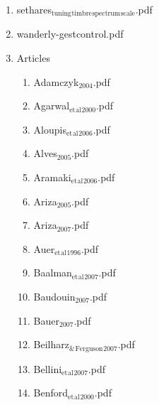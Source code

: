 \documentclass[11pt]{article}
\begin{document}
\begin{enumerate}
\item sethares$_{\text{tuning}}$$_{\text{timbre}}$$_{\text{spectrum}}$$_{\text{scale}}$.pdf
\label{sec-1-1-1-1-11-19-15}

\item wanderly-gestcontrol.pdf
\label{sec-1-1-1-1-11-19-16}

\item Articles
\label{sec-1-1-1-1-11-19-17}
\begin{enumerate}
\item Adamczyk$_{\text{2004}}$.pdf
\label{sec-1-1-1-1-11-19-17-1}

\item Agarwal$_{\text{et}}$$_{\text{al}}$$_{\text{2000}}$.pdf
\label{sec-1-1-1-1-11-19-17-2}

\item Aloupis$_{\text{et}}$$_{\text{al}}$$_{\text{2006}}$.pdf
\label{sec-1-1-1-1-11-19-17-3}

\item Alves$_{\text{2005}}$.pdf
\label{sec-1-1-1-1-11-19-17-4}

\item Aramaki$_{\text{et}}$$_{\text{al}}$$_{\text{2006}}$.pdf
\label{sec-1-1-1-1-11-19-17-5}

\item Ariza$_{\text{2005}}$.pdf
\label{sec-1-1-1-1-11-19-17-6}

\item Ariza$_{\text{2007}}$.pdf
\label{sec-1-1-1-1-11-19-17-7}

\item Auer$_{\text{et}}$$_{\text{al}}$$_{\text{1996}}$.pdf
\label{sec-1-1-1-1-11-19-17-8}

\item Baalman$_{\text{et}}$$_{\text{al}}$$_{\text{2007}}$.pdf
\label{sec-1-1-1-1-11-19-17-9}

\item Baudouin$_{\text{2007}}$.pdf
\label{sec-1-1-1-1-11-19-17-10}

\item Bauer$_{\text{2007}}$.pdf
\label{sec-1-1-1-1-11-19-17-11}

\item Beilharz$_{\text{\&}}$$_{\text{Ferguson}}$$_{\text{2007}}$.pdf
\label{sec-1-1-1-1-11-19-17-12}

\item Bellini$_{\text{et}}$$_{\text{al}}$$_{\text{2007}}$.pdf
\label{sec-1-1-1-1-11-19-17-13}

\item Benford$_{\text{et}}$$_{\text{al}}$$_{\text{2000}}$.pdf
\label{sec-1-1-1-1-11-19-17-14}


\end{enumerate}
\end{enumerate}
\end{document}
